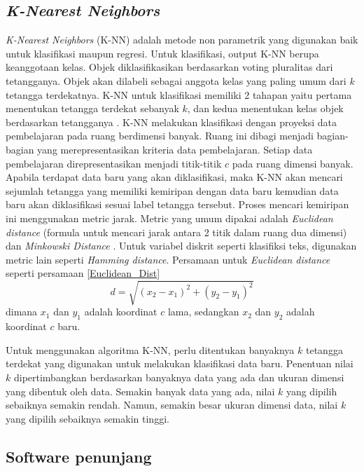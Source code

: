 \documentclass[../thesis.tex]{subfiles}
\begin{document}
\subsection{\textit{K-Nearest Neighbors}}
\textit{K-Nearest Neighbors} (K-NN) adalah metode non parametrik yang digunakan baik untuk klasifikasi maupun regresi. Untuk klasifikasi, output K-NN berupa keanggotaan kelas. Objek diklasifikasikan berdasarkan voting pluralitas dari tetangganya. Objek akan dilabeli sebagai anggota kelas yang paling umum dari $k$ tetangga terdekatnya.
K-NN untuk klasifikasi memiliki 2 tahapan yaitu pertama menentukan tetangga terdekat sebanyak $k$, dan kedua menentukan kelas objek berdasarkan tetangganya \cite{KNN}. 
K-NN melakukan klasifikasi dengan proyeksi data pembelajaran pada ruang berdimensi banyak. Ruang ini dibagi menjadi bagian-bagian yang merepresentasikan kriteria data pembelajaran. Setiap data pembelajaran direpresentasikan menjadi titik-titik $c$ pada ruang dimensi banyak.
Apabila terdapat data baru yang akan diklasifikasi, maka K-NN akan mencari sejumlah tetangga yang memiliki kemiripan dengan data baru kemudian data baru akan diklasifikasi sesuai label tetangga tersebut. 
Proses mencari kemiripan ini menggunakan metric jarak. Metric yang umum dipakai adalah \textit{Euclidean distance} (formula untuk mencari jarak antara 2 titik dalam ruang dua dimensi) dan \textit{Minkowski Distance} \cite{KNN}. Untuk variabel diskrit seperti klasifiksi teks, digunakan metric lain seperti \textit{Hamming distance}.
Persamaan untuk \textit{Euclidean distance} seperti persamaan \ref{Euclidean_Dist}
\begin{equation} \label{Euclidean_Dist}
	d = \sqrt{(x_2 - x_1)^2 + (y_2 - y_1)^2}
\end{equation}
dimana $x_1$ dan $y_1$ adalah koordinat $c$ lama, sedangkan $x_2$ dan $y_2$ adalah koordinat $c$ baru. 

Untuk menggunakan algoritma K-NN, perlu ditentukan banyaknya $k$ tetangga terdekat yang digunakan untuk melakukan klasifikasi data baru.
Penentuan nilai $k$ dipertimbangkan berdasarkan banyaknya data yang ada dan ukuran dimensi yang dibentuk oleh data. Semakin banyak data yang ada, nilai $k$ yang dipilih sebaiknya semakin rendah. Namun, semakin besar ukuran dimensi data, nilai $k$ yang dipilih sebaiknya semakin tinggi.


\subsection{Software penunjang}
\end{document}
